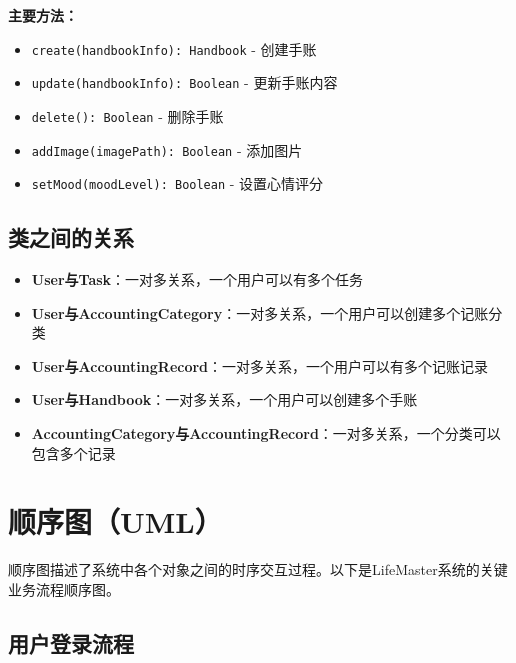 \documentclass[a4paper]{article}
\begin{document}
\textbf{主要方法：}
\begin{itemize}
    \item \texttt{create(handbookInfo): Handbook} - 创建手账
    \item \texttt{update(handbookInfo): Boolean} - 更新手账内容
    \item \texttt{delete(): Boolean} - 删除手账
    \item \texttt{addImage(imagePath): Boolean} - 添加图片
    \item \texttt{setMood(moodLevel): Boolean} - 设置心情评分
\end{itemize}

\subsection{类之间的关系}

\begin{itemize}
    \item \textbf{User与Task}：一对多关系，一个用户可以有多个任务
    \item \textbf{User与AccountingCategory}：一对多关系，一个用户可以创建多个记账分类
    \item \textbf{User与AccountingRecord}：一对多关系，一个用户可以有多个记账记录
    \item \textbf{User与Handbook}：一对多关系，一个用户可以创建多个手账
    \item \textbf{AccountingCategory与AccountingRecord}：一对多关系，一个分类可以包含多个记录
\end{itemize}

\section{顺序图（UML）}

顺序图描述了系统中各个对象之间的时序交互过程。以下是LifeMaster系统的关键业务流程顺序图。

\subsection{用户登录流程}
\end{document}
